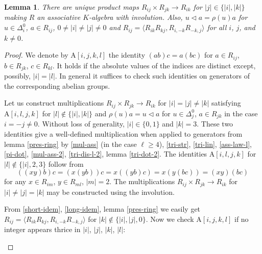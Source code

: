 \documentclass{article}
\newtheorem{lemma}{Lemma}
\theoremstyle{definition}
\begin{document}
\begin{lemma} \label{ring-struct}
    There are unique product maps \(R_{ij} \times R_{jk} \to R_{ik}\) for \(|j| \in \{|i|, |k|\}\) making \(R\) an associative \(K\)-algebra with involution. Also, \(
        u \triangleleft a = \rho(u) a
    \) for \(u \in \Delta^0_i\), \(a \in R_{ij}\), \(
        0 \neq |i| \neq |j| \neq 0
    \) and \(
        R_{ij} = \langle
            R_{ik} R_{kj},
            R_{i, -k} R_{-k, j}
        \rangle
    \) for all \(i\), \(j\), and \(k \neq 0\).
\end{lemma}
\begin{proof}
    We denote by \(
        \mathrm A[i, j, k, l]
    \) the identity \(
        (ab)c = a(bc)
    \) for \(a \in R_{ij}\), \(b \in R_{jk}\), \(c \in R_{kl}\). It holds if the absolute values of the indices are distinct except, possibly, \(|i| = |l|\). In general it suffices to check such identities on generators of the corresponding abelian groups.

    Let us construct multiplications \(
        R_{ij} \times R_{jk} \to R_{ik}
    \) for \(
        |i| = |j| \neq |k|
    \) satisfying \(
        \mathrm A[i, l, j, k]
    \) for \(
        |l| \notin \{|i|, |k|\}
    \) and \(
        \rho(u) a = u \triangleleft a
    \) for \(u \in \Delta^0_j\), \(a \in R_{jk}\) in the case \(i = -j \neq 0\). Without loss of generality, \(
        |i| \in \{0, 1\}
    \) and \(|k| = 3\). These two identities give a well-defined multiplication when applied to generators from lemma \ref{pres-ring} by \ref{mul-ass} (in the case \(\ell \geq 4\)), \ref{tri-str}, \ref{tri-lin}, \ref{ass-law-l}, \ref{pi-dot}, \ref{mul-ass-2}, \ref{tri-dis-l-2}, lemma \ref{tri-dot-2}. The identities \(
        \mathrm A[i, l, j, k]
    \) for \(
        |l| \notin \{|i|, 2, 3\}
    \) follow from \[
        ((xy)b)c
        =
        (x(yb))c
        =
        x((yb)c)
        =
        x(y(bc))
        =
        (xy)(bc)
    \] for any \(x \in R_{im}\), \(y \in R_{ml}\), \(|m| = 2\). The multiplications \(
        R_{ij} \times R_{jk} \to R_{ik}
    \) for \(
        |i| \neq |j| = |k|
    \) may be constructed using the involution.

    From \ref{short-idem}, \ref{long-idem}, lemma \ref{pres-ring} we easily get \(
        R_{ij} = \langle
            R_{ik} R_{kj},
            R_{i, -k} R_{-k, j}
        \rangle
    \) for \(
        |k| \notin \{|i|, |j|, 0\}
    \). Now we check \(
        \mathrm A[i, j, k, l]
    \) if no integer appears thrice in \(|i|\), \(|j|\), \(|k|\), \(|l|\):
    \begin{itemize}


\end{itemize}
\end{proof}
\end{document}
